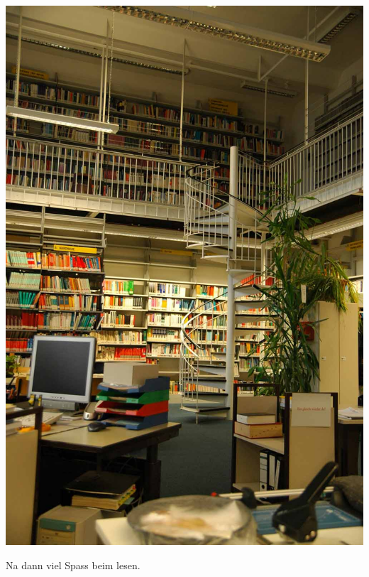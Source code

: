 \begin{center}
\includegraphics[width=0.7\linewidth]{bilder/bib.jpg}
\end{center}

Na dann viel Spass beim lesen.
\spaltenende
